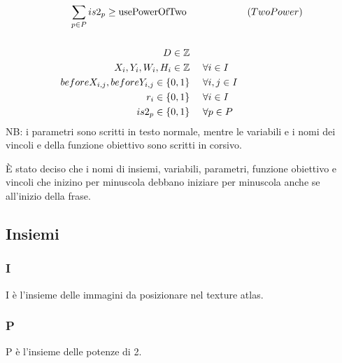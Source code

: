 \begin{align*}
\sum_{p \in P} is2_p \geq \text{usePowerOfTwo}       \ \ \ \ \   & & \eqname{(TwoPower)} \\
\\
%
%
%
%
%
D \in \IntegerSet \ \ \ \ & & \\
X_i, Y_i, W_i, H_i \in \IntegerSet      \ \ \ \ & \fori{} \\
beforeX_{i,j}, beforeY_{i,j} \in \BinSet    \ \ \ \ & \forall{i,j \in I} \\
%
r_i \in \BinSet \ \ \ \ & \fori{} \\
%
is2_p \in \BinSet \ \ \ \ & \forall{p \in P} \\
%
%
%
 \end{align*}
NB: i parametri sono scritti in testo normale, mentre le variabili e i nomi dei vincoli e della funzione obiettivo sono scritti in corsivo.




\iffalse
Changelog del modello

Il modello è passato per più fasi incrementali:
* La prima versione risolve il problema base
* Quindi è stato aggiunto il supporto per il bleeding
* La terza versione ha aggiunto la possibilità di ruotare le immagini
* La quarta e ultima versione permette di fissare la dimensione della texture atlas a potenze di 2
\fi



\newpage
È stato deciso che i nomi di insiemi, variabili, parametri, funzione obiettivo e vincoli che inizino per minuscola debbano iniziare per minuscola anche se all'inizio della frase.

\subsection{Insiemi}
\subsubsection{I}
I è l'insieme delle immagini da posizionare nel texture atlas.

\subsubsection{P}
P è l'insieme delle potenze di 2.





